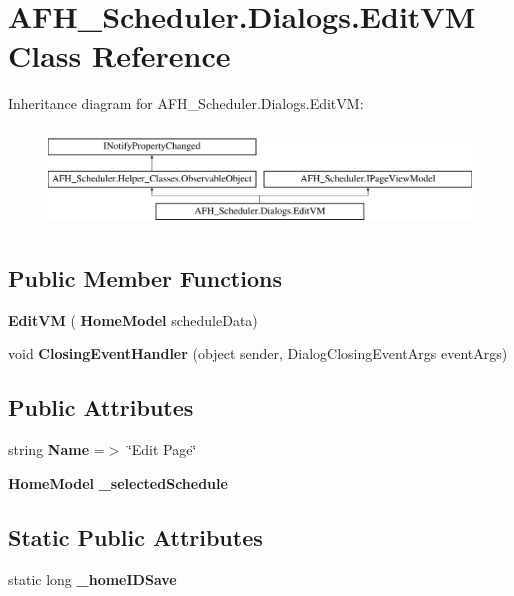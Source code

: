 \section{A\+F\+H\+\_\+\+Scheduler.\+Dialogs.\+Edit\+VM Class Reference}
\label{class_a_f_h___scheduler_1_1_dialogs_1_1_edit_v_m}
Inheritance diagram for A\+F\+H\+\_\+\+Scheduler.\+Dialogs.\+Edit\+VM\+:\begin{figure}[H]
\begin{center}
\leavevmode
\includegraphics[height=2.700965cm]{class_a_f_h___scheduler_1_1_dialogs_1_1_edit_v_m}
\end{center}
\end{figure}
\subsection*{Public Member Functions}
\begin{DoxyCompactItemize}
\item 
\mbox{\label{class_a_f_h___scheduler_1_1_dialogs_1_1_edit_v_m_ae171b4eeff0564fc33a2fb10ea67016b}} 
{\bfseries Edit\+VM} (\textbf{ Home\+Model} schedule\+Data)
\item 
\mbox{\label{class_a_f_h___scheduler_1_1_dialogs_1_1_edit_v_m_ac834370aabf24b40266982fd52452f31}} 
void {\bfseries Closing\+Event\+Handler} (object sender, Dialog\+Closing\+Event\+Args event\+Args)
\end{DoxyCompactItemize}
\subsection*{Public Attributes}
\begin{DoxyCompactItemize}
\item 
\mbox{\label{class_a_f_h___scheduler_1_1_dialogs_1_1_edit_v_m_a0c7ad23bc2a62ada284eae3f75dd3b17}} 
string {\bfseries Name} =$>$ \char`\"{}Edit Page\char`\"{}
\item 
\mbox{\label{class_a_f_h___scheduler_1_1_dialogs_1_1_edit_v_m_a9c8440277d5d5b8a71294b670061c796}} 
\textbf{ Home\+Model} {\bfseries \+\_\+selected\+Schedule}
\end{DoxyCompactItemize}
\subsection*{Static Public Attributes}
\begin{DoxyCompactItemize}
\item 
\mbox{\label{class_a_f_h___scheduler_1_1_dialogs_1_1_edit_v_m_a41fd6105d3a0c08a205ff1546def7cae}} 
static long {\bfseries \+\_\+home\+I\+D\+Save}
\end{DoxyCompactItemize}
